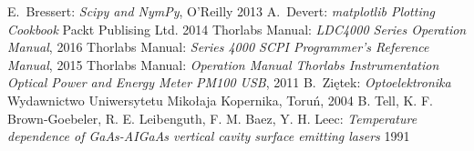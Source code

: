 \begin{thebibliography}{99}
 E.~Bressert:
\emph{Scipy and NymPy},
O'Reilly 2013
  A.~Devert:
\emph{matplotlib Plotting Cookbook}
Packt Publising Ltd. 2014
 Thorlabs Manual:
\emph{LDC4000 Series Operation Manual},
2016
 Thorlabs Manual:
\emph{Series 4000 SCPI Programmer's Reference Manual},
2015
 Thorlabs Manual:
\emph{Operation Manual
Thorlabs Instrumentation Optical Power and Energy Meter PM100 USB},
2011
  B.~Ziętek:
\emph{Optoelektronika}
Wydawnictwo Uniwersytetu Mikołaja Kopernika, Toruń, 2004
 B. Tell, K. F. Brown-Goebeler, R. E. Leibenguth, F. M.  Baez, Y. H. Leec:
\emph{Temperature dependence of GaAs-AIGaAs vertical cavity surface emitting lasers }
1991
\end{thebibliography}

